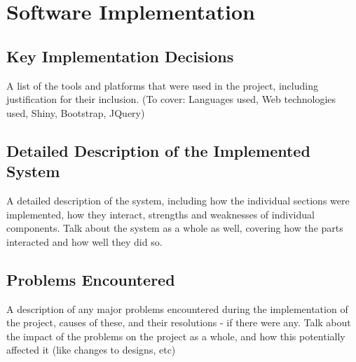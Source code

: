 \section{Software Implementation}

\subsection{Key Implementation Decisions}
\label{sec:kid}
{\color{red} A list of the tools and platforms that were used in the project, including justification for their inclusion. (To cover: Languages used, Web technologies used, Shiny, Bootstrap, JQuery)}


\subsection{Detailed Description of the Implemented System}
{\color{red} A detailed description of the system, including how the individual sections were implemented, how they interact, strengths and weaknesses of individual components. Talk about the system as a whole as well, covering how the parts interacted and how well they did so.}


\subsection{Problems Encountered}
{\color{red} 
A description of any major problems encountered during the implementation of the project, causes of these, and their resolutions - if there were any. Talk about the impact of the problems on the project as a whole, and how this potentially affected it (like changes to designs, etc)
}
